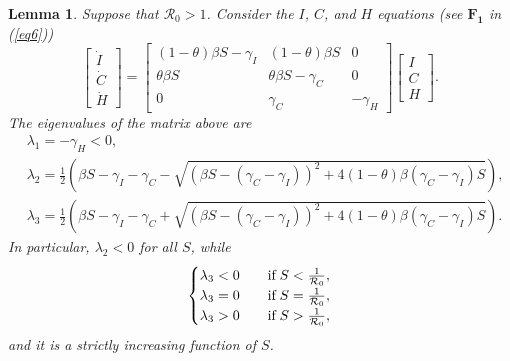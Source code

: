 \documentclass[11pt,reqno]{amsart}
\newtheorem{lemma}{Lemma}
\theoremstyle{boldremark}
\begin{document}
\begin{lemma} \label{lemma2}
    Suppose that $\mathcal{R}_0>1$. Consider the $I$, $C$, and $H$ equations (see $\mathbf{F_1}$ in (\ref{eq6})) 
    \begin{equation*} 
    \begin{bmatrix}
        \dot{I} \\ \dot{C} \\ \dot{H} 
    \end{bmatrix}
    =
    \begin{bmatrix}
        (1-\theta) \beta S-\gamma_I & (1-\theta)\beta S  & 0 \\  
        \theta \beta S & \theta \beta S - \gamma_C & 0 \\ 
        0 & \gamma_C & -\gamma_H
    \end{bmatrix}
    \begin{bmatrix}
       I \\ C \\ H
    \end{bmatrix}. 
    \end{equation*}
    The eigenvalues of the matrix above are 
    \begin{equation} \label{eq7}
    \begin{split}
        &\lambda_1=-\gamma_H<0, \\ 
        &\lambda_{2} = \frac{1}{2} \left(  \beta S - \gamma_I - \gamma_C - \sqrt{           
        (\beta S - (\gamma_C - \gamma_I))^2 + 4(1-\theta) \beta (\gamma_C - \gamma_I) S} \right), \\ 
        &\lambda_{3} = \frac{1}{2} \left(  \beta S - \gamma_I - \gamma_C + \sqrt{           
        (\beta S - (\gamma_C - \gamma_I))^2 + 4(1-\theta) \beta (\gamma_C - \gamma_I) S} \right).
    \end{split}
    \end{equation}
    In particular, $\lambda_2 < 0 $ for all $S$, while 
    \begin{align} \label{eq8} 
        \begin{cases}
            \lambda_3 < 0 \quad & \textnormal{if} \; S<\frac{1}{\mathcal{R}_0}, \\ 
            \lambda_3 = 0 & \textnormal{if} \; S=\frac{1}{\mathcal{R}_0}, \\ 
            \lambda_3 > 0 & \textnormal{if} \; S>\frac{1}{\mathcal{R}_0}, \\ 
        \end{cases} 
    \end{align}
    and it is a strictly increasing function of $S$. 
\end{lemma}
\end{document}
